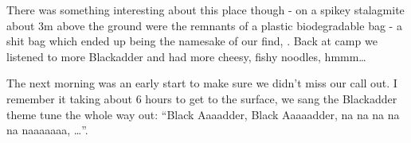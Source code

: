 There was something interesting about this place though - on a spikey stalagmite about 3m above the ground were the remnants of a plastic biodegradable bag - a shit bag which ended up being the namesake of our find, . Back at camp we listened to more Blackadder and had more cheesy, fishy noodles, hmmm…

The next morning was an early start to make sure we didn’t miss our call out. I remember it taking about 6 hours to get to the surface, we sang the Blackadder theme tune the whole way out: “Black Aaaadder, Black Aaaaadder, na na na na na naaaaaaa, …”.


